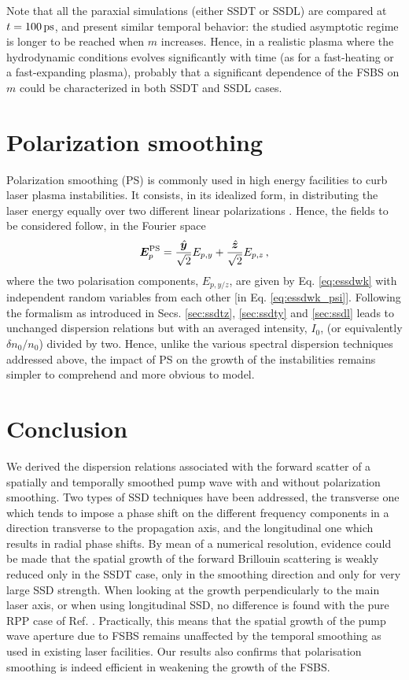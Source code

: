 \documentclass[
 reprint,
 amsmath,amssymb,
 aps,
]{revtex4-1}
\begin{document}
Note that all the paraxial simulations (either SSDT or SSDL) are compared at $t=100 \,\rm ps$,  and present similar temporal behavior: the studied asymptotic regime is longer to be reached when $m$ increases. Hence, in a realistic plasma where the hydrodynamic conditions evolves significantly with time (as for a fast-heating or a fast-expanding plasma), probably that a significant dependence of the FSBS on $m$ could be characterized in both SSDT and SSDL cases.  

\section{Polarization smoothing}
Polarization smoothing (PS) is commonly used in high energy facilities to curb laser plasma instabilities. It consists, in its idealized form, in distributing the laser energy equally over two different linear polarizations \cite[]{PRL_Moody_2001,NatPhys_Glenzer,NatPhys_Labaune}. Hence, the fields to be considered follow, in the Fourier space
\begin{equation}
    \bm E_p^\mathrm{PS} = \frac{ \Hat{\bm y}}{\sqrt{2}} E_{p,y} +  \frac{ \Hat{\bm z}}{\sqrt{2}} E_{p,z}\, ,
\end{equation}
where the two polarisation components, $E_{p,y/z}$, are given by Eq. \eqref{eq:essdwk} with independent random variables from each other [in Eq. \eqref{eq:essdwk_psi}]. Following the formalism as introduced in Secs. \ref{sec:ssdtz}, \ref{sec:ssdty} and \ref{sec:ssdl} leads to unchanged dispersion relations but with an averaged intensity, $I_0$, (or equivalently $\delta n_0/n_0$) divided by two. Hence, unlike the various spectral dispersion techniques addressed above, the impact of PS on the growth of the instabilities remains simpler to comprehend and more obvious to model. 

\section{Conclusion}
We derived the dispersion relations associated with the forward scatter of a spatially and temporally smoothed pump wave with and without polarization smoothing. Two types of SSD techniques have been  addressed, the transverse one which tends to impose a phase shift on the different frequency components in a direction transverse to the propagation axis, and the longitudinal one which results in radial phase shifts. By mean of a numerical resolution, evidence could be made that the spatial growth of the forward Brillouin scattering is weakly reduced only in the SSDT case, only in the smoothing direction and only for very large SSD strength. When looking at the growth perpendicularly to the main laser axis, or when using longitudinal SSD, no difference is found with the pure RPP case of Ref.  \cite[]{Ruyer_FSBS}. Practically, this means that the spatial growth of the pump wave aperture due to FSBS remains unaffected by the temporal  smoothing as used in existing laser facilities. Our results also confirms  that polarisation smoothing is indeed efficient in weakening the growth of the FSBS. 
\end{document}
